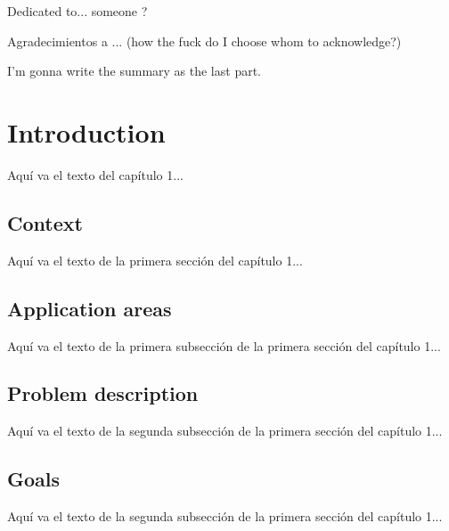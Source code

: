\documentclass{iccmemoria}
\author{Erik Andrés Regla Torres}
\date{mes, año}
\begin{document}
\maketitle

\begin{dedicatory}
  Dedicated to... someone ? %
\end{dedicatory}

\begin{acknowledgment}
  Agradecimientos a ... (how the fuck do I choose whom to acknowledge?)
\end{acknowledgment}

\tableofcontents
\listoffigures
\listoftables

\begin{resumen}
  I'm gonna write the summary as the last part.
\end{resumen}


\chapter{Introduction}
Aquí va el texto del capítulo 1...

\section{Context}
Aquí va el texto de la primera sección del capítulo 1...

\section{Application areas}
Aquí va el texto de la primera subsección de la primera sección del capítulo 1...

\section{Problem description}
Aquí va el texto de la segunda subsección de la primera sección del capítulo 1...

\section{Goals}
Aquí va el texto de la segunda subsección de la primera sección del capítulo 1...
\end{document}
